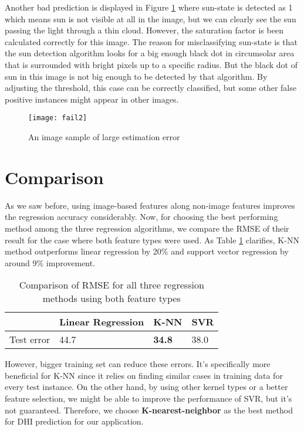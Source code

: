 \newline
Another bad prediction is displayed in Figure \ref{fig:img_fail2} where sun-state is detected as 1 which means sun is not visible at all in the image, but we can clearly see the sun passing the light through a thin cloud. However, the saturation factor is been calculated correctly for this image. The reason for misclassifying sun-state is that the sun detection algorithm looks for a big enough black dot in circumsolar area that is surrounded with bright pixels up to a specific radius. But the black dot of sun in this image is not big enough to be detected by that algorithm. By adjusting the threshold, this case can be correctly classified, but some other false positive instances might appear in other images.

\begin{figure}[h]
\caption{An image sample of large estimation error}
\label{fig:img_fail2}
\texttt{[image: fail2]}
\centering
\end{figure}


\section{Comparison}
As we saw before, using image-based features along non-image features improves the regression accuracy considerably. Now, for choosing the best performing method among the three regression algorithms, we compare the RMSE of their result for the case where both feature types were used. As Table \ref{table:rmse_cmp} clarifies, K-NN method outperforms linear regression by 20\% and support vector regression by around 9\% improvement.

\begin{table}[h!]
\centering
\begin{tabular}{ |p{2cm}||p{4cm}|p{2cm}|p{2cm}|  }
\hline
 &Linear Regression& K-NN & SVR\\
 \hline
Test error& 44.7 & \textbf{34.8} & 38.0\\
 \hline
\end{tabular}
\caption{Comparison of RMSE for all three regression methods using both feature types}
\label{table:rmse_cmp}
\end{table}

However, bigger training set can reduce these errors. It's specifically more beneficial for K-NN since it relies on finding similar cases in training data for every test instance. On the other hand, by using other kernel types or a better feature selection, we might be able to improve the performance of SVR, but it's not guaranteed. Therefore, we choose \textbf{K-nearest-neighbor} as the best method for DHI prediction for our application.

